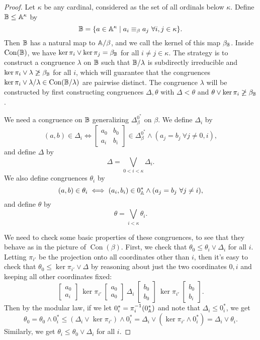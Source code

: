 \documentclass[letterpaper,11pt]{article}
\DeclareMathOperator{\Con}{Con}
\begin{document}
\begin{proof}
Let $\kappa$ be any cardinal, considered as the set of all ordinals below $\kappa$. Define $\mathbb{B} \le \mathbb{A}^\kappa$ by
\[
\mathbb{B} = \{a \in \mathbb{A}^\kappa \mid a_i \equiv_\beta a_j\ \forall i,j \in \kappa\}.
\]
Then $\mathbb{B}$ has a natural map to $\mathbb{A}/\beta$, and we call the kernel of this map $\beta_{\mathbb{B}}$. Inside $\Con(\bB)$, we have $\ker \pi_i \vee \ker \pi_j = \beta_{\mathbb{B}}$ for all $i \ne j \in \kappa$. The strategy is to construct a congruence $\lambda$ on $\mathbb{B}$ such that $\mathbb{B}/\lambda$ is subdirectly irreducible and $\ker \pi_i \vee \lambda \not\ge \beta_{\mathbb{B}}$ for all $i$, which will guarantee that the congruences $\ker \pi_i \vee \lambda/\lambda \in \Con(\bB/\lambda)$ are pairwise distinct. The congruence $\lambda$ will be constructed by first constructing congruences $\Delta, \theta$ with $\Delta < \theta$ and $\theta \vee \ker \pi_i \not\ge \beta_{\mathbb{B}}$.

We need a congruence on $\mathbb{B}$ generalizing $\Delta_\beta^{0^*}$ on $\beta$. We define $\Delta_i$ by
\[
(a,b) \in \Delta_i \iff \begin{bmatrix} a_0 & b_0\\ a_i & b_i\end{bmatrix} \in \Delta_\beta^{0^*} \wedge (a_j = b_j\ \forall j \ne 0,i),
\]
and define $\Delta$ by
\[
\Delta = \bigvee_{0 < i < \kappa} \Delta_i.
\]
We also define congruences $\theta_i$ by
\[
(a,b) \in \theta_i \iff (a_i,b_i) \in 0_{\mathbb{A}}^* \wedge (a_j = b_j\ \forall j \ne i),
\]
and define $\theta$ by
\[
\theta = \bigvee_{i < \kappa} \theta_i.
\]

We need to check some basic properties of these congruences, to see that they behave as in the picture of $\Con(\beta)$. First, we check that $\theta_0 \le \theta_i \vee \Delta_i$ for all $i$. Letting $\pi_{i'}$ be the projection onto all coordinates other than $i$, then it's easy to check that $\theta_0 \le \ker \pi_{i'} \vee \Delta$ by reasoning about just the two coordinates $0,i$ and keeping all other coordinates fixed:
\[
\begin{bmatrix} a_0\\ a_i\end{bmatrix}\ \ker \pi_{i'}\ \begin{bmatrix} a_0\\ a_0\end{bmatrix}\ \Delta_i\ \begin{bmatrix} b_0\\ b_0\end{bmatrix}\ \ker \pi_{i'}\ \begin{bmatrix} b_0\\ b_i\end{bmatrix}.
\]
Then by the modular law, if we let $0^*_i = \pi_i^{-1}(0^*_{\mathbb{A}})$ and note that $\Delta_i \le 0^*_i$, we get
\[
\theta_0 = \theta_0 \wedge 0^*_i \le (\Delta_i \vee \ker \pi_{i'}) \wedge 0^*_i = \Delta_i \vee (\ker \pi_{i'} \wedge 0^*_i) = \Delta_i \vee \theta_i.
\]
Similarly, we get $\theta_i \le \theta_0 \vee \Delta_i$ for all $i$.


\end{proof}
\end{document}
